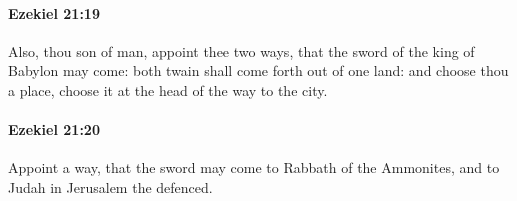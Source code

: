 		\paragraph{Ezekiel 21:19} %
			\label{EZEKIEL-21-19}

			Also, thou son of man, appoint thee two ways, that the sword of the king of Babylon may come: both twain shall come forth out of one land: and choose thou a place, choose it at the head of the way to the city.


		\paragraph{Ezekiel 21:20} %
			\label{EZEKIEL-21-20}

			Appoint a way, that the sword may come to Rabbath of the Ammonites, and to Judah in Jerusalem the defenced.


